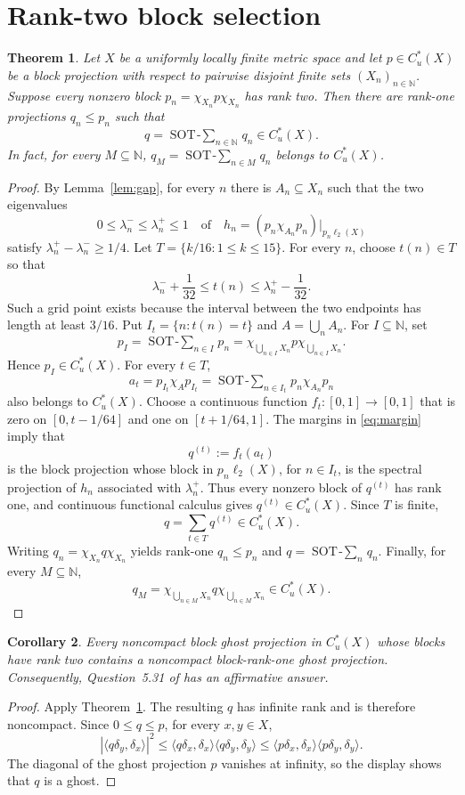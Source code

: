\documentclass[11pt]{article}
\newtheorem{theorem}{Theorem}
\newtheorem{corollary}[theorem]{Corollary}
\newcommand{\Cu}{C_u^*}
\newcommand{\ellTwo}{\ell_2}
\newcommand{\SOT}{\mathop{\mathrm{SOT}\!-\!\sum}}
\begin{document}
\section{Rank-two block selection}
\begin{theorem}\label{thm:main}
Let $X$ be a uniformly locally finite metric space and let
$p\in\Cu(X)$ be a block projection with respect to pairwise disjoint
finite sets $(X_n)_{n\in\mathbb N}$. Suppose every nonzero block
$p_n=\chi_{X_n}p\chi_{X_n}$ has rank two. Then there are rank-one
projections $q_n\leq p_n$ such that
\[
 q=\SOT_{n\in\mathbb N}q_n\in\Cu(X).
\]
In fact, for every $M\subseteq\mathbb N$,
$q_M=\SOT_{n\in M}q_n$ belongs to $\Cu(X)$.
\end{theorem}
\begin{proof}
By Lemma~\ref{lem:gap}, for every $n$ there is $A_n\subseteq X_n$ such
that the two eigenvalues
\[
0\leq\lambda_n^-\leq\lambda_n^+\leq1
\quad\text{of}\quad h_n=(p_n\chi_{A_n}p_n)|_{p_n\ellTwo(X)}
\]
satisfy $\lambda_n^+-\lambda_n^-\geq1/4$.
Let $T=\{k/16:1\leq k\leq15\}$. For every $n$, choose
$t(n)\in T$ so that
\begin{equation}\label{eq:margin}
\lambda_n^-+\frac1{32}\leq t(n)\leq\lambda_n^+-\frac1{32}.
\end{equation}
Such a grid point exists because the interval between the two endpoints has
length at least $3/16$. Put $I_t=\{n:t(n)=t\}$ and $A=\bigcup_nA_n$.
For $I\subseteq\mathbb N$, set
\[
p_I=\SOT_{n\in I}p_n
=\chi_{\bigcup_{n\in I}X_n}p\chi_{\bigcup_{n\in I}X_n}.
\]
Hence $p_I\in\Cu(X)$. For every $t\in T$,
\[
a_t=p_{I_t}\chi_Ap_{I_t}
=\SOT_{n\in I_t}p_n\chi_{A_n}p_n
\]
also belongs to $\Cu(X)$. Choose a continuous function
$f_t:[0,1]\to[0,1]$ that is zero on $[0,t-1/64]$ and one on
$[t+1/64,1]$. The margins in \eqref{eq:margin} imply that
\[
q^{(t)}:=f_t(a_t)
\]
is the block projection whose block in $p_n\ellTwo(X)$, for $n\in I_t$,
is the spectral projection of $h_n$ associated with $\lambda_n^+$.
Thus every nonzero block of $q^{(t)}$ has rank one, and continuous
functional calculus gives $q^{(t)}\in\Cu(X)$.
Since $T$ is finite,
\[
q=\sum_{t\in T}q^{(t)}\in\Cu(X).
\]
Writing $q_n=\chi_{X_n}q\chi_{X_n}$ yields rank-one $q_n\leq p_n$ and
$q=\SOT_nq_n$. Finally, for every $M\subseteq\mathbb N$,
\[
q_M=\chi_{\bigcup_{n\in M}X_n}q\chi_{\bigcup_{n\in M}X_n}\in\Cu(X).
\]
\end{proof}
\begin{corollary}\label{cor:ghost}
Every noncompact block ghost projection in $\Cu(X)$ whose blocks have
rank two contains a noncompact block-rank-one ghost projection.
Consequently, Question~5.31 of \cite{Vig} has an affirmative answer.
\end{corollary}
\begin{proof}
Apply Theorem~\ref{thm:main}. The resulting $q$ has infinite rank and is
therefore noncompact. Since $0\leq q\leq p$, for every $x,y\in X$,
\[
|\langle q\delta_y,\delta_x\rangle|^2
\leq\langle q\delta_x,\delta_x\rangle\langle q\delta_y,\delta_y\rangle
\leq\langle p\delta_x,\delta_x\rangle\langle p\delta_y,\delta_y\rangle.
\]
The diagonal of the ghost projection $p$ vanishes at infinity, so the
display shows that $q$ is a ghost.
\end{proof}
\end{document}

